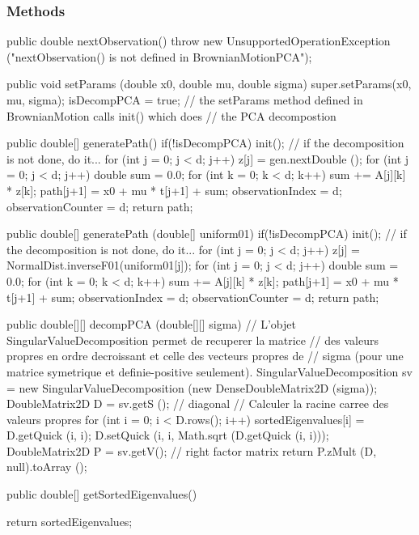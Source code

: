 \subsubsection* {Methods}
\begin{code}\begin{hide}

   public double nextObservation() {
        throw new UnsupportedOperationException ("nextObservation() is not defined in BrownianMotionPCA");
    }

   public void setParams (double x0, double mu, double sigma) {
        super.setParams(x0, mu, sigma);
        isDecompPCA = true;  // the setParams method defined in BrownianMotion calls init() which does
                             // the PCA decompostion
    }

   public double[] generatePath() {
       if(!isDecompPCA) {init();}  // if the decomposition is not done, do it...
       for (int j = 0; j < d; j++)
           z[j] = gen.nextDouble ();
       for (int j = 0; j < d; j++) {
           double sum = 0.0;
           for (int k = 0; k < d; k++)
               sum += A[j][k] * z[k];
           path[j+1] = x0 + mu * t[j+1] + sum;
       }
       observationIndex   = d;
       observationCounter = d;
       return path;
    }

   public double[] generatePath (double[] uniform01) {
       if(!isDecompPCA) {init();}  // if the decomposition is not done, do it...
       for (int j = 0; j < d; j++)
           z[j] = NormalDist.inverseF01(uniform01[j]);
       for (int j = 0; j < d; j++) {
           double sum = 0.0;
           for (int k = 0; k < d; k++)
               sum += A[j][k] * z[k];
           path[j+1] = x0 + mu * t[j+1] + sum;
       }
       observationIndex   = d;
       observationCounter = d;
       return path;
    }

   public double[][] decompPCA (double[][] sigma){
      // L'objet SingularValueDecomposition permet de recuperer la matrice
      // des valeurs propres en ordre decroissant et celle des vecteurs propres de
      // sigma (pour une matrice symetrique et definie-positive seulement).
      SingularValueDecomposition sv =
         new SingularValueDecomposition (new DenseDoubleMatrix2D (sigma));
      DoubleMatrix2D D = sv.getS ();    // diagonal
      // Calculer la racine carree des valeurs propres
      for (int i = 0; i < D.rows(); i++){
         sortedEigenvalues[i] = D.getQuick (i, i);
         D.setQuick (i, i, Math.sqrt (D.getQuick (i, i)));
      }
      DoubleMatrix2D P = sv.getV();   // right factor matrix
      return P.zMult (D, null).toArray ();
   }\end{hide}

   public double[] getSortedEigenvalues() \begin{hide} {
        return sortedEigenvalues;
   }\end{hide}
\end{code}
